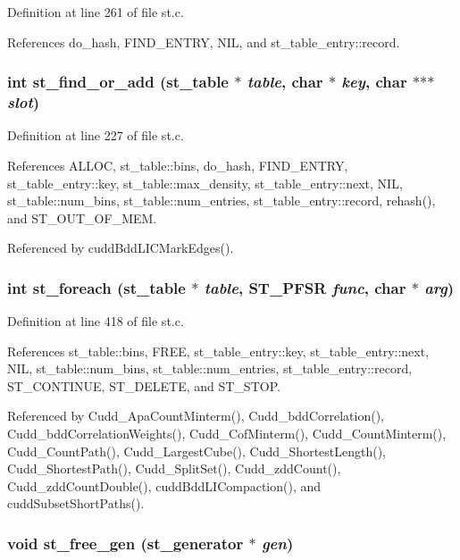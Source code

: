 Definition at line 261 of file st.c.

References do\_\-hash, FIND\_\-ENTRY, NIL, and st\_\-table\_\-entry::record.
\subsubsection{\setlength{\rightskip}{0pt plus 5cm}int st\_\-find\_\-or\_\-add (\bf{st\_\-table} $\ast$ {\em table}, char $\ast$ {\em key}, char $\ast$$\ast$$\ast$ {\em slot})}\label{st_8c_44ecb97d7f538951538c6f1ede4f60a6}




Definition at line 227 of file st.c.

References ALLOC, st\_\-table::bins, do\_\-hash, FIND\_\-ENTRY, st\_\-table\_\-entry::key, st\_\-table::max\_\-density, st\_\-table\_\-entry::next, NIL, st\_\-table::num\_\-bins, st\_\-table::num\_\-entries, st\_\-table\_\-entry::record, rehash(), and ST\_\-OUT\_\-OF\_\-MEM.

Referenced by cudd\-Bdd\-LICMark\-Edges().
\subsubsection{\setlength{\rightskip}{0pt plus 5cm}int st\_\-foreach (\bf{st\_\-table} $\ast$ {\em table}, \bf{ST\_\-PFSR} {\em func}, char $\ast$ {\em arg})}\label{st_8c_4d18e5a6949c772c9ff8c3c70ec00b57}




Definition at line 418 of file st.c.

References st\_\-table::bins, FREE, st\_\-table\_\-entry::key, st\_\-table\_\-entry::next, NIL, st\_\-table::num\_\-bins, st\_\-table::num\_\-entries, st\_\-table\_\-entry::record, ST\_\-CONTINUE, ST\_\-DELETE, and ST\_\-STOP.

Referenced by Cudd\_\-Apa\-Count\-Minterm(), Cudd\_\-bdd\-Correlation(), Cudd\_\-bdd\-Correlation\-Weights(), Cudd\_\-Cof\-Minterm(), Cudd\_\-Count\-Minterm(), Cudd\_\-Count\-Path(), Cudd\_\-Largest\-Cube(), Cudd\_\-Shortest\-Length(), Cudd\_\-Shortest\-Path(), Cudd\_\-Split\-Set(), Cudd\_\-zdd\-Count(), Cudd\_\-zdd\-Count\-Double(), cudd\-Bdd\-LICompaction(), and cudd\-Subset\-Short\-Paths().
\subsubsection{\setlength{\rightskip}{0pt plus 5cm}void st\_\-free\_\-gen (\bf{st\_\-generator} $\ast$ {\em gen})}\label{st_8c_d41b7ddada4e857c815181e0da79c8e1}




